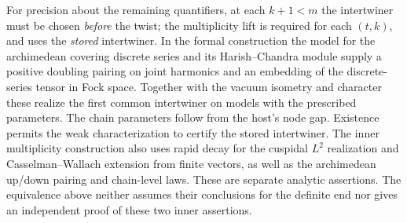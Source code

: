 For precision about the remaining quantifiers, at each $k+1<m$ the
intertwiner must be chosen \emph{before} the twist; the multiplicity
lift is required for each $(t,k)$, and uses the \emph{stored}
intertwiner. In the formal construction the model for the
archimedean covering discrete series and its Harish--Chandra module
supply a positive doubling pairing on joint harmonics and an embedding
of the discrete-series tensor in Fock space. Together with the vacuum
isometry and character these realize the first common intertwiner
on models with the prescribed parameters. The chain parameters follow
from the host's node gap. Existence permits the weak characterization
to certify the stored intertwiner. The inner multiplicity construction
also uses rapid decay for the cuspidal $L^2$ realization and
Casselman--Wallach extension from finite vectors, as well as the
archimedean up/down pairing and chain-level laws. These are separate
analytic assertions. The equivalence above neither assumes their
conclusions for the definite end nor gives an independent proof of
these two inner assertions.
